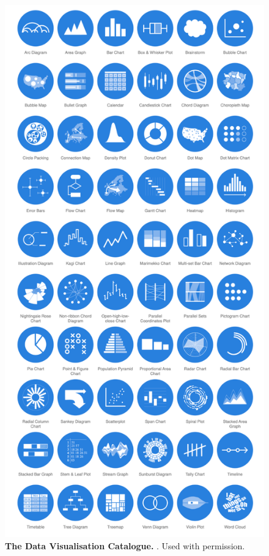 \begin{figure}[h!]
    \centering
    \includegraphics[height=0.8\textheight]{figures/A.2.png}
    \caption[The Data Visualisation Catalogue]{\textbf{The Data Visualisation Catalogue.} 
\citep{ribecca_data_2017}. Used with permission.}
    \label{fig:A.2}
\end{figure}

